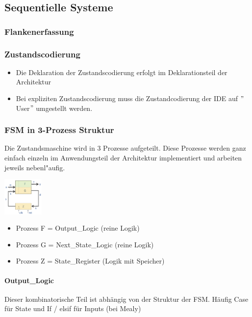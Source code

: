 	
			\begin{multicols}{2}
			\subsection{Sequentielle Systeme}
		\subsubsection{Flankenerfassung}
				
		\vfill\null
				\columnbreak	
		\subsubsection{Zustandscodierung}
				\begin{itemize}
				\itemsep0em
					\item Die Deklaration der Zustandscodierung erfolgt im Deklarationsteil der Architektur
					\item Bei expliziten Zustandscodierung muss die Zustandcodierung der 
						IDE auf $"$User$"$ umgestellt werden.
				\end{itemize}
				
				
			\end{multicols}
			\begin{multicols}{2}
			
			
			\clearpage
			
		\subsubsection{FSM in 3-Prozess Struktur}
			Die Zustandsmaschine wird in 3 Prozesse aufgeteilt. Diese Prozesse werden ganz 
			einfach einzeln im Anwendungsteil der Architektur implementiert und arbeiten 
			jeweils nebenl"aufig.
			
				\begin{center}
					\includegraphics[width=0.15\textwidth]{pics/fsmprocesslogic}
				\end{center}
				\begin{itemize}
				\itemsep0em
					\item Prozess F = Output\_Logic (reine Logik)
					\item Prozess G = Next\_State\_Logic (reine Logik)
					\item Prozess Z = State\_Register (Logik mit Speicher)
				\end{itemize}
				\paragraph{Output\_Logic}
					Dieser kombinatorische Teil ist abhängig von der Struktur der FSM. Häufig Case für State und If / elsif für Inputs (bei Mealy)
					
				\end{multicols}
